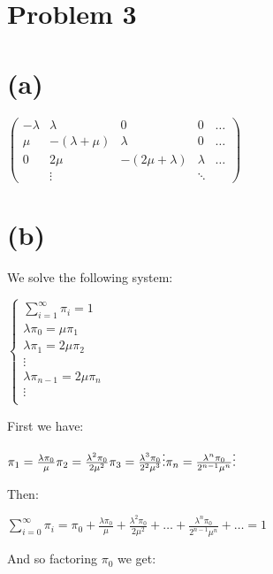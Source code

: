 \documentclass[]{article}
\begin{document}
\hypertarget{problem-3}{%
\section{Problem 3}\label{problem-3}}

\hypertarget{a-1}{%
\section{(a)}\label{a-1}}

\(\begin{pmatrix} - \lambda & \lambda & 0 & 0 & \dots \\ \mu & - (\lambda + \mu) & \lambda & 0 & \dots \\ 0 & 2 \mu & - (2 \mu + \lambda) & \lambda & \dots \\ & \vdots & & \ddots & \end{pmatrix}\)

\hypertarget{b-1}{%
\section{(b)}\label{b-1}}

We solve the following system:

\(\begin{cases} \sum_{i = 1}^{\infty} \pi_i = 1 \\ \lambda \pi_0 = \mu \pi_1 \\ \lambda \pi_1 = 2 \mu \pi_2 \\ \vdots \\ \lambda \pi_{n-1} = 2 \mu \pi_n \\ \vdots \\ \end{cases}\)

First we have:

\(\pi_1 = \frac{\lambda \pi_0}{\mu} \\ \pi_2 = \frac{\lambda^2 \pi_0}{2 \mu^2} \\ \pi_3 = \frac{\lambda^3 \pi_0}{2^2 \mu^3} \\ \vdots \\ \pi_n = \frac{\lambda^n \pi_0}{2^{n-1} \mu^n} \\ \vdots\)

Then:

\(\sum_{i=0}^{\infty} \pi_i = \pi_0 + \frac{\lambda \pi_0}{\mu} + \frac{\lambda^2 \pi_0}{2 \mu^2} + \dots + \frac{\lambda^n \pi_0}{2^{n-1} \mu^n} + \dots = 1\)

And so factoring \(\pi_0\) we get:
\end{document}
